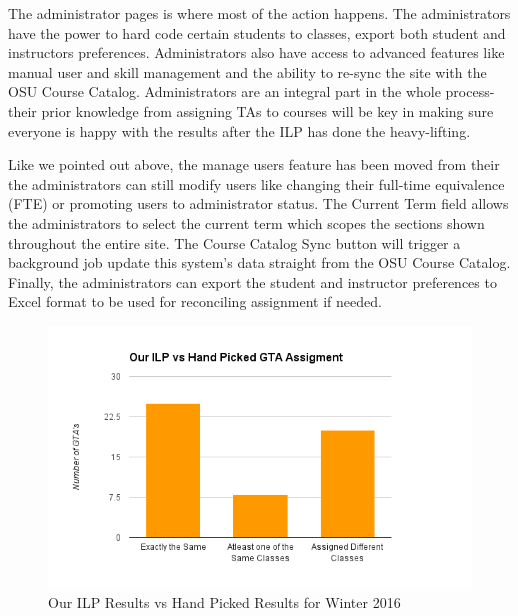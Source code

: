 
The administrator pages is where most of the action happens.
The administrators have the power to hard code certain students to classes, export both student and instructors preferences.
Administrators also have access to advanced features like manual user and skill management and the ability to re-sync the site with the OSU Course Catalog.
Administrators are an integral part in the whole process- their prior knowledge from assigning TAs to courses will be key in making sure everyone is happy with the results after the ILP has done the heavy-lifting.

Like we pointed out above, the manage users feature has been moved from their the administrators can still modify users like changing their full-time equivalence (FTE) or promoting users to administrator status.
The Current Term field allows the administrators to select the current term which scopes the sections shown throughout the entire site.
The Course Catalog Sync button will trigger a background job update this system's data straight from the OSU Course Catalog.
Finally, the administrators can export the student and instructor preferences to Excel format to be used for reconciling assignment if needed.

\begin{figure}[!htb]
  \centering
  \includegraphics[width=0.75\linewidth]{images/ILPResults.png}
  \centering
  \caption{Our ILP Results vs Hand Picked Results for Winter 2016}\label{ILPresults}
\end{figure}

